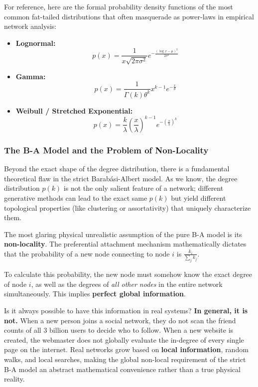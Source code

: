 For reference, here are the formal probability density functions of the most common fat-tailed distributions that often masquerade as power-laws in empirical network analysis:

\begin{itemize}
    \item \textbf{Lognormal:}
          \[
              p(x) = \frac{1}{x\sqrt{2\pi\sigma^2}} e^{-\frac{(\log x - \mu)^2}{2\sigma^2}}
          \]
    \item \textbf{Gamma:}
          \[
              p(x) = \frac{1}{\Gamma(k)\theta^k} x^{k-1} e^{-\frac{x}{\theta}}
          \]
    \item \textbf{Weibull / Stretched Exponential:}
          \[
              p(x) = \frac{k}{\lambda} \left(\frac{x}{\lambda}\right)^{k-1} e^{-\left(\frac{x}{\lambda}\right)^k}
          \]
\end{itemize}

\subsubsection{The B-A Model and the Problem of Non-Locality}

Beyond the exact shape of the degree distribution, there is a fundamental theoretical flaw in the strict Barabási-Albert model. As we know, the degree distribution \( p(k) \) is not the only salient feature of a network; different generative methods can lead to the exact same \( p(k) \) but yield different topological properties (like clustering or assortativity) that uniquely characterize them.

The most glaring physical unrealistic assumption of the pure B-A model is its \textbf{non-locality}.
The preferential attachment mechanism mathematically dictates that the probability of a new node connecting to node \( i \) is \( \frac{k_i}{\sum_j k_j} \).

To calculate this probability, the new node must somehow know the exact degree of node \( i \), as well as the degrees of \textit{all other nodes} in the entire network simultaneously. This implies \textbf{perfect global information}.

Is it always possible to have this information in real systems? \textbf{In general, it is not.}
When a new person joins a social network, they do not scan the friend counts of all 3 billion users to decide who to follow. When a new website is created, the webmaster does not globally evaluate the in-degree of every single page on the internet. Real networks grow based on \textbf{local information}, random walks, and local searches, making the global non-local requirement of the strict B-A model an abstract mathematical convenience rather than a true physical reality.

